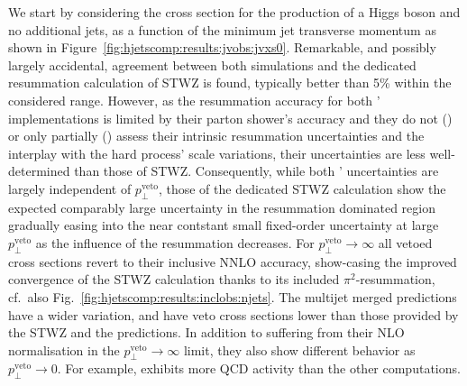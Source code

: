 We start by considering 
the cross section for the production of a Higgs boson and no 
additional jets, as a function of the minimum jet transverse momentum 
as shown in Figure~\ref{fig:hjetscomp:results:jvobs:jvxs0}. Remarkable, 
and possibly largely accidental, 
agreement between both \hjetscompNNLOPS simulations and the dedicated resummation 
calculation of STWZ is found, typically better than 5\% within the considered range. 
However, as the resummation accuracy for both \hjetscompNNLOPS' implementations is 
limited by their parton 
shower's accuracy and they do not (\hjetscompPowheg) or only partially (\hjetscompSherpa) 
assess their intrinsic resummation uncertainties and the interplay with 
the hard process' scale variations, their uncertainties are less 
well-determined than those of STWZ. Consequently, while both \hjetscompNNLOPS' uncertainties are largely 
independent of $p_\perp^\text{veto}$, those of the dedicated STWZ calculation 
show the expected comparably large uncertainty in the resummation dominated 
region gradually easing into the near contstant small fixed-order uncertainty 
at large $p_\perp^\text{veto}$ as the influence of the resummation decreases. 
For $p_\perp^\text{veto}\to\infty$ all vetoed cross sections revert to their 
inclusive NNLO accuracy, show-casing the improved convergence of the STWZ 
calculation thanks to its included $\pi^2$-resummation, cf.\ also Fig.\ 
\ref{fig:hjetscomp:results:inclobs:njets}. 
The multijet merged predictions have a wider variation, and have veto cross sections lower than
those provided by the STWZ and the \hjetscompNNLOPS predictions. In addition to 
suffering from their NLO normalisation in the $p_\perp^\text{veto}\to\infty$ 
limit, they also show different behavior as $p_\perp^\text{veto}\to 0$. For example, 
\hjetscompSherpa \hjetscompMEPSatNLO exhibits more QCD activity than the other computations. 


